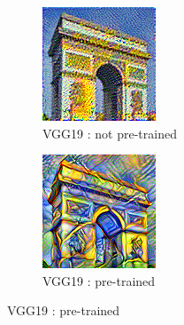 \documentclass[12pt]{beamer}
\begin{document}
    \begin{frame}
        \begin{figure}[H]
            \centering
            \begin{subfigure}[b]{0.45\textwidth}
                \centering
                \includegraphics[width=\textwidth]{resources/gatys/models/sun-trees-paris-notpretrained.png}
                \caption{VGG19 : not pre-trained}
            \end{subfigure}
            \hfill
            \begin{subfigure}[b]{0.45\textwidth}
                \centering
                \includegraphics[width=\textwidth]{resources/gatys/models/sun-trees-paris-pretrained.png}
                \caption{VGG19 : pre-trained}
            \end{subfigure}
        \end{figure}
        

\end{frame}
\end{document}
